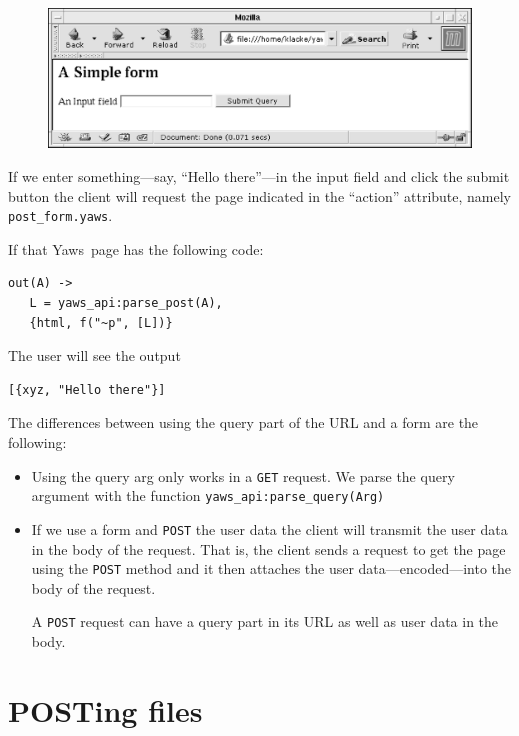 \documentclass[11pt,oneside,english]{book}
\newcommand{\Yaws}            %
        {{\sc Yaws}}
\begin{document}
\begin{figure}[h]
\begin{center}

 \includegraphics[scale=0.6] {a}

\end{center}
\end{figure}


If we enter something---say, ``Hello there''---in the input field and
click the submit button the client will request the page indicated in
the ``action'' attribute, namely \verb+post_form.yaws+.

If that \Yaws\  page has the following code:

\begin{verbatim}
out(A) ->
   L = yaws_api:parse_post(A),
   {html, f("~p", [L])}
\end{verbatim}

The user will see the output

\begin{verbatim}
[{xyz, "Hello there"}]
\end{verbatim}

The differences between using the query part of the URL
and a form are the following:

\begin{itemize}
\item Using the query arg only works in a \verb+GET+ request. We parse
  the query argument with the function
  \verb+yaws_api:parse_query(Arg)+

\item If we use a form and \verb+POST+ the user data the client will
  transmit the user data in the body of the request.  That is, the
  client sends a request to get the page using the \verb+POST+ method
  and it then attaches the user data---encoded---into the body of the
  request.

A \verb+POST+ request can have a query part in its URL as well as user
data in the body.
\end{itemize}


\section{POSTing files}
\end{document}
